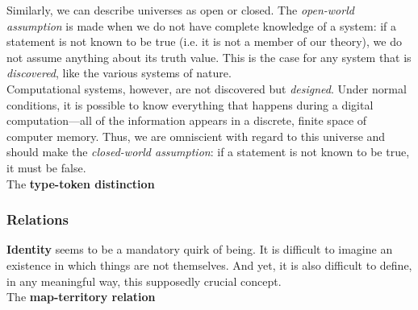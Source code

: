 Similarly, we can describe universes as open or closed. The \textit{open-world assumption} is made when we do not have complete knowledge of a system: if a statement is not known to be true (i.e. it is not a member of our theory), we do not assume anything about its truth value. This is the case for any system that is \textit{discovered}, like the various systems of nature. \\

Computational systems, however, are not discovered but \textit{designed}. Under normal conditions, it is possible to know everything that happens during a digital computation---all of the information appears in a discrete, finite space of computer memory. Thus, we are omniscient with regard to this universe and should make the \textit{closed-world assumption}: if a statement is not known to be true, it must be false. \\


The \textbf{type-token distinction} \\


\subsubsection{Relations}


\textbf{Identity} seems to be a mandatory quirk of being. It is difficult to imagine an existence in which things are not themselves. And yet, it is also difficult to define, in any meaningful way, this supposedly crucial concept. \\



The \textbf{map-territory relation} \\


